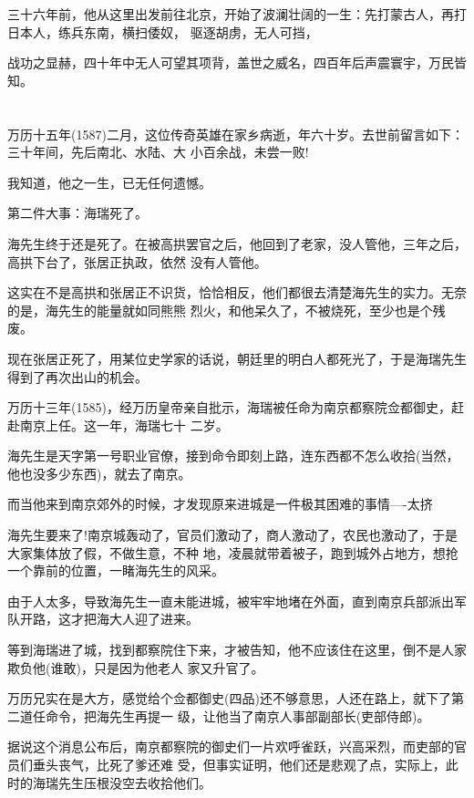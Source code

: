\documentclass[11pt,a4paper,onecolumn]{article}
\begin{document}
三十六年前，他从这里出发前往北京，开始了波澜壮阔的一生：先打蒙古人，再打日本人，练兵东南，横扫倭奴，
驱逐胡虏，无人可挡，

战功之显赫，四十年中无人可望其项背，盖世之威名，四百年后声震寰宇，万民皆知。

\section[\thesection]{}

万历十五年(1587)二月，这位传奇英雄在家乡病逝，年六十岁。去世前留言如下：三十年间，先后南北、水陆、大
小百余战，未尝一败!

我知道，他之一生，已无任何遗憾。

第二件大事：海瑞死了。

海先生终于还是死了。在被高拱罢官之后，他回到了老家，没人管他，三年之后，高拱下台了，张居正执政，依然
没有人管他。

这实在不是高拱和张居正不识货，恰恰相反，他们都很去清楚海先生的实力。无奈的是，海先生的能量就如同熊熊
烈火，和他呆久了，不被烧死，至少也是个残废。

现在张居正死了，用某位史学家的话说，朝廷里的明白人都死光了，于是海瑞先生得到了再次出山的机会。

万历十三年(1585)，经万历皇帝亲自批示，海瑞被任命为南京都察院佥都御史，赶赴南京上任。这一年，海瑞七十
二岁。

海先生是天字第一号职业官僚，接到命令即刻上路，连东西都不怎么收拾(当然，他也没多少东西)，就去了南京。

而当他来到南京郊外的时候，才发现原来进城是一件极其困难的事情----太挤

海先生要来了!南京城轰动了，官员们激动了，商人激动了，农民也激动了，于是大家集体放了假，不做生意，不种
地，凌晨就带着被子，跑到城外占地方，想抢一个靠前的位置，一睹海先生的风采。

由于人太多，导致海先生一直未能进城，被牢牢地堵在外面，直到南京兵部派出军队开路，这才把海大人迎了进来。

等到海瑞进了城，找到都察院住下来，才被告知，他不应该住在这里，倒不是人家欺负他(谁敢)，只是因为他老人
家又升官了。

万历兄实在是大方，感觉给个佥都御史(四品)还不够意思，人还在路上，就下了第二道任命令，把海先生再提一
级，让他当了南京人事部副部长(吏部侍郎)。

据说这个消息公布后，南京都察院的御史们一片欢呼雀跃，兴高采烈，而吏部的官员们垂头丧气，比死了爹还难
受，但事实证明，他们还是悲观了点，实际上，此时的海瑞先生压根没空去收拾他们。
\end{document}
